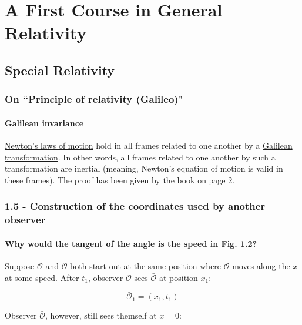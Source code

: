 



    \part{A First Course in General Relativity\cite{first-course-on-gr}}

    \chapter{Special Relativity}

    \section*{On ``Principle of relativity (Galileo)"}

    \subsection*{Galilean invariance}

    \href{https://en.wikipedia.org/wiki/Newton\%27s_laws_of_motion}{Newton's laws of motion} hold in all frames related
    to one another by a \href{https://en.wikipedia.org/wiki/Galilean\_transformation}{Galilean transformation}. In
    other words, all frames related to one another by such a transformation are inertial (meaning, Newton's equation of
    motion is valid in these frames).\cite{galilean-invariance} The proof has been given by the book on page 2.

    \section*{1.5 - Construction of the coordinates used by another observer}

    \subsection*{Why would the tangent of the angle is the speed in Fig. 1.2?}

    Suppose $\mathscr{O}$ and $\mathscr{\bar{O}}$ both start out at the same position where $\mathscr{\bar{O}}$
    moves along the $x$ at some speed. After $t_1$, observer $\mathscr{O}$ sees $\mathscr{\bar{O}}$ at position $x_1$:

    \[ \mathscr{\bar{O}}_1 = (x_1, t_1) \]

    Observer  $\mathscr{\bar{O}}$, however, still sees themself at $x = 0$:

